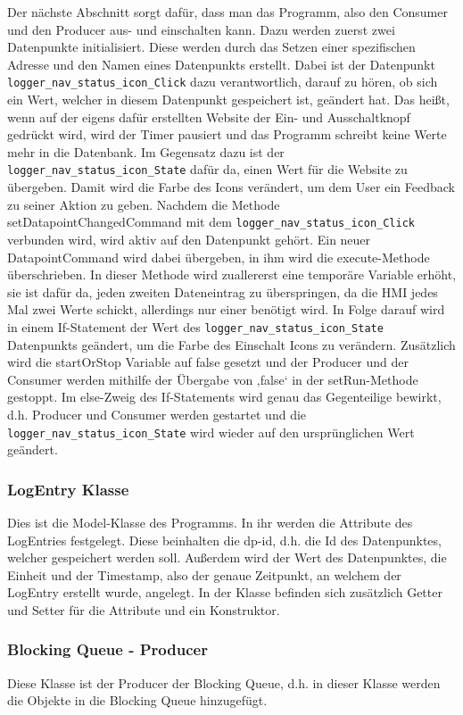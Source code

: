 Der nächste Abschnitt sorgt dafür, dass man das Programm, also den Consumer und den Producer aus- und einschalten kann. Dazu werden zuerst zwei Datenpunkte initialisiert. Diese werden durch das Setzen einer spezifischen Adresse und den Namen eines Datenpunkts erstellt. Dabei ist der Datenpunkt \texttt{logger\_nav\_status\_icon\_Click} dazu verantwortlich, darauf zu hören, ob sich ein Wert, welcher in diesem Datenpunkt gespeichert ist, geändert hat. Das heißt, wenn auf der eigens dafür erstellten Website der Ein- und Ausschaltknopf gedrückt wird, wird der Timer pausiert und das Programm schreibt keine Werte mehr in die Datenbank. Im Gegensatz dazu ist der \texttt{logger\_nav\_status\_icon\_State} dafür da, einen Wert für die Website zu übergeben. Damit wird die Farbe des Icons verändert, um dem User ein Feedback zu seiner Aktion zu geben.
Nachdem die Methode setDatapointChangedCommand mit dem \texttt{logger\_nav\_status\_icon\_Click} verbunden wird, wird aktiv auf den Datenpunkt gehört. Ein neuer DatapointCommand wird dabei übergeben, in ihm wird die execute-Methode überschrieben. In dieser Methode wird zuallererst eine temporäre Variable erhöht, sie ist dafür da, jeden zweiten Dateneintrag zu überspringen, da die HMI jedes Mal zwei Werte schickt, allerdings nur einer benötigt wird. In Folge darauf wird in einem If-Statement der Wert des \texttt{logger\_nav\_status\_icon\_State} Datenpunkts geändert, um die Farbe des Einschalt Icons zu verändern. Zusätzlich wird die startOrStop Variable auf false gesetzt und der Producer und der Consumer werden mithilfe der Übergabe von ‚false‘ in der setRun-Methode gestoppt. Im else-Zweig des If-Statements wird genau das Gegenteilige bewirkt, d.h. Producer und Consumer werden gestartet und die \texttt{logger\_nav\_status\_icon\_State} wird wieder auf den ursprünglichen Wert geändert. 

\subsubsection{LogEntry Klasse}
Dies ist die Model-Klasse des Programms. In ihr werden die Attribute des LogEntries festgelegt. Diese beinhalten die dp-id, d.h. die Id des Datenpunktes, welcher gespeichert werden soll. Außerdem wird der Wert des Datenpunktes, die Einheit und der Timestamp, also der genaue Zeitpunkt, an welchem der LogEntry erstellt wurde, angelegt. In der Klasse befinden sich zusätzlich Getter und Setter für die Attribute und ein Konstruktor. 

\subsubsection{Blocking Queue - Producer }
Diese Klasse ist der Producer der Blocking Queue, d.h. in dieser Klasse werden die Objekte in die Blocking Queue hinzugefügt. 

